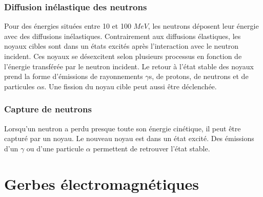 \subsubsection{Diffusion inélastique des neutrons}
Pour des énergies situées entre 10 et 100 $MeV$, les neutrons déposent leur énergie avec des diffusions inélastiques. Contrairement aux diffusions élastiques, les noyaux cibles sont dans un états excités après l'interaction avec le neutron incident. Ces noyaux se désexcitent selon plusieurs processus en fonction de l'énergie transférée par le neutron incident. Le retour à l’état stable des noyaux prend la forme d'émissions de rayonnements $\gamma$s, de protons, de neutrons et de particules $\alpha$s. Une fission du noyau cible peut aussi être déclenchée. 
\subsubsection{Capture de neutrons}
Lorsqu'un neutron a perdu presque toute son énergie cinétique, il peut être capturé par un noyau. Le nouveau noyau est dans un état excité. Des émissions d'un $\gamma$ ou d'une particule $\alpha$ permettent de retrouver l'état stable.

\section{Gerbes électromagnétiques}


